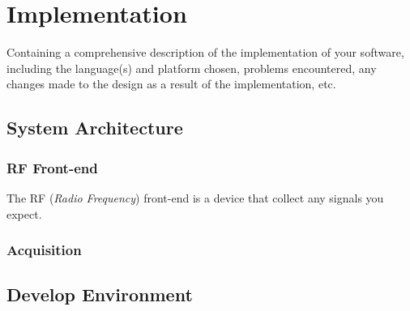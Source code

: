 \chapter{Implementation}

Containing a comprehensive description of the implementation of your software, including the language(s) and platform chosen, problems encountered, any changes made to the design as a result of the implementation, etc.

\section{System Architecture}
\subsection{RF Front-end}
The RF (\textit{Radio Frequency}) front-end is a device that collect any signals you expect.

\subsection{Acquisition}
\section{Develop Environment}

